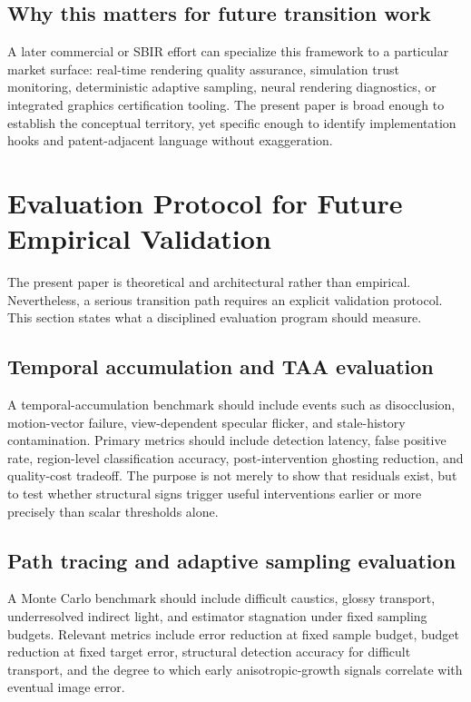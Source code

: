 \documentclass[11pt,letterpaper]{article}
\theoremstyle{gcresult}
\theoremstyle{definition}
\begin{document}
\subsection{Why this matters for future transition work}
A later commercial or SBIR effort can specialize this framework to a particular market surface: real-time rendering quality assurance, simulation trust monitoring, deterministic adaptive sampling, neural rendering diagnostics, or integrated graphics certification tooling. The present paper is broad enough to establish the conceptual territory, yet specific enough to identify implementation hooks and patent-adjacent language without exaggeration.

\section{Evaluation Protocol for Future Empirical Validation}

The present paper is theoretical and architectural rather than empirical. Nevertheless, a serious transition path requires an explicit validation protocol. This section states what a disciplined evaluation program should measure.

\subsection{Temporal accumulation and TAA evaluation}
A temporal-accumulation benchmark should include events such as disocclusion, motion-vector failure, view-dependent specular flicker, and stale-history contamination. Primary metrics should include detection latency, false positive rate, region-level classification accuracy, post-intervention ghosting reduction, and quality-cost tradeoff. The purpose is not merely to show that residuals exist, but to test whether structural signs trigger useful interventions earlier or more precisely than scalar thresholds alone.

\subsection{Path tracing and adaptive sampling evaluation}
A Monte Carlo benchmark should include difficult caustics, glossy transport, underresolved indirect light, and estimator stagnation under fixed sampling budgets. Relevant metrics include error reduction at fixed sample budget, budget reduction at fixed target error, structural detection accuracy for difficult transport, and the degree to which early anisotropic-growth signals correlate with eventual image error.
\end{document}
